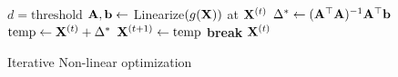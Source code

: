 
\begin{algorithm}[htpb]
\begin{algorithmic}[1]
    \State $d = \text{threshold}$
        \State $\mathbf{A}, \mathbf{b} \leftarrow$ Linearize$(g(\mathbf{X}))$ at $\mathbf{X}^{(t)}$
        \State $\Delta^* \leftarrow (\mathbf{A}^\top \mathbf{A})^{-1} \mathbf{A}^\top \mathbf{b}$ 
        \State $\text{temp} \leftarrow \mathbf{X}^{(t)} + \Delta^*$
            \State $\mathbf{X}^{(t+1)} \leftarrow \text{temp}$
                \State \textbf{break}
            \EndIf
        \EndIf
    \EndFor
    \State \Return $\mathbf{X}^{(t)}$
\EndProcedure
\end{algorithmic}
\caption[short caption]{Iterative Non-linear optimization}
\label{gauss-newton}
\end{algorithm}
